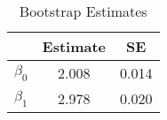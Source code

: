 \begin{table}[htb]
\centering
\caption{Bootstrap Estimates}
\label{table:ea3:ps1:q3b:tab2}
\begin{tabular}{lcc}
\hline
 & Estimate & SE \\
\hline\hline
$\beta_0$ & 2.008 & 0.014 \\
$\beta_1$ & 2.978 & 0.020 \\
\hline
\end{tabular}
\end{table}
